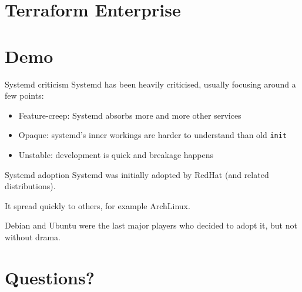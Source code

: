 \documentclass[12pt]{beamer}
\begin{document}
\section{Terraform Enterprise}

\section{Demo}

\begin{frame}{Systemd criticism}
  Systemd has been heavily criticised, usually focusing around a few points:
  \begin{itemize}
  \item Feature-creep: Systemd absorbs more and more other services
  \item Opaque: systemd's inner workings are harder to understand than old \texttt{init}
  \item Unstable: development is quick and breakage happens
  \end{itemize}
\end{frame}

\begin{frame}{Systemd adoption}
  Systemd was initially adopted by RedHat (and related distributions).

  It spread quickly to others, for example ArchLinux.

  Debian and Ubuntu were the last major players who decided to adopt it, but not without drama.
\end{frame}

\section{Questions?}
\end{document}
